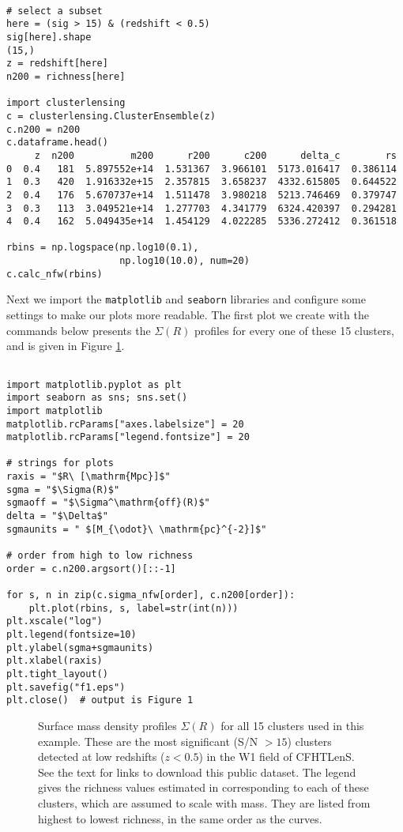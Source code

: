 \documentclass[twocolumn]{aastex6}
\newcommand{\code}{\lstinline[style=codeintext]}
\begin{document}
\begin{lstlisting}

# select a subset
here = (sig > 15) & (redshift < 0.5)
sig[here].shape
(15,)
z = redshift[here]
n200 = richness[here]

import clusterlensing
c = clusterlensing.ClusterEnsemble(z)
c.n200 = n200
c.dataframe.head()
     z  n200          m200      r200      c200      delta_c        rs
0  0.4   181  5.897552e+14  1.531367  3.966101  5173.016417  0.386114
1  0.3   420  1.916332e+15  2.357815  3.658237  4332.615805  0.644522
2  0.4   176  5.670737e+14  1.511478  3.980218  5213.746469  0.379747
3  0.3   113  3.049521e+14  1.277703  4.341779  6324.420397  0.294281
4  0.4   162  5.049435e+14  1.454129  4.022285  5336.272412  0.361518

rbins = np.logspace(np.log10(0.1),
                    np.log10(10.0), num=20)
c.calc_nfw(rbins)
\end{lstlisting}

Next we import the \code{matplotlib} and \code{seaborn} libraries and configure some settings to make our plots more readable. The first plot we create with the commands below presents the $\Sigma(R)$ profiles for every one of these 15 clusters, and is given in Figure \ref{f1}.

\begin{lstlisting}

import matplotlib.pyplot as plt
import seaborn as sns; sns.set()
import matplotlib
matplotlib.rcParams["axes.labelsize"] = 20
matplotlib.rcParams["legend.fontsize"] = 20

# strings for plots
raxis = "$R\ [\mathrm{Mpc}]$"
sgma = "$\Sigma(R)$"
sgmaoff = "$\Sigma^\mathrm{off}(R)$"
delta = "$\Delta$"
sgmaunits = " $[M_{\odot}\ \mathrm{pc}^{-2}]$"

# order from high to low richness
order = c.n200.argsort()[::-1]

for s, n in zip(c.sigma_nfw[order], c.n200[order]):
    plt.plot(rbins, s, label=str(int(n)))
plt.xscale("log")
plt.legend(fontsize=10)
plt.ylabel(sgma+sgmaunits)
plt.xlabel(raxis)
plt.tight_layout()
plt.savefig("f1.eps")
plt.close()  # output is Figure 1

\end{lstlisting}

\begin{figure}
\caption{Surface mass density profiles $\Sigma(R)$ for all 15 clusters used in this example. These are the most significant (S/N $>15$) clusters detected at low redshifts ($z < 0.5$) in the W1 field of CFHTLenS. See the text for links to download this public dataset. The legend gives the richness values estimated in \citet{Ford15} corresponding to each of these clusters, which are assumed to scale with mass. They are listed from highest to lowest richness, in the same order as the curves.}
\label{f1}
\end{figure}
\end{document}
